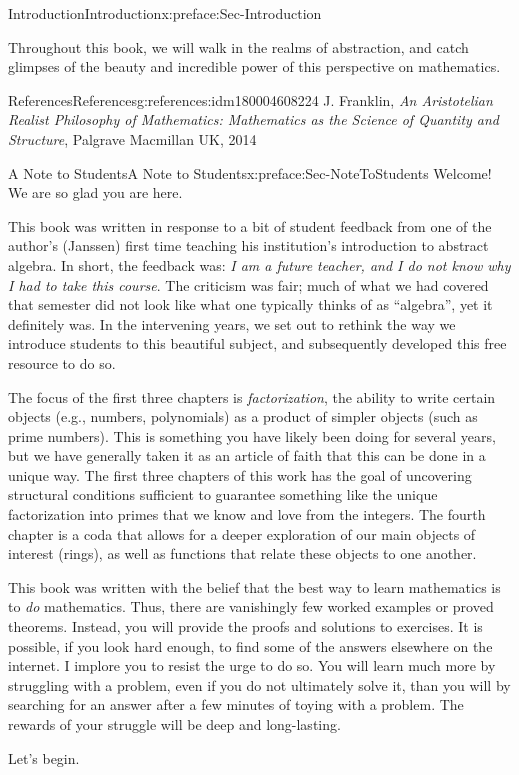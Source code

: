 \documentclass[oneside,10pt,]{book}
\numberwithin{equation}{section}
\begin{document}
\begin{preface}{Introduction}{}{Introduction}{}{}{x:preface:Sec-Introduction}
\par
Throughout this book, we will walk in the realms of abstraction, and catch glimpses of the beauty and incredible power of this perspective on mathematics.%
%
%
\typeout{************************************************}
\typeout{************************************************}
%
\begin{references--numberless}{References}{}{References}{}{}{g:references:idm180004608224}
J. Franklin, \emph{An Aristotelian Realist Philosophy of Mathematics: Mathematics as the Science of Quantity and Structure}, Palgrave Macmillan UK, 2014\end{references--numberless}
\end{preface}
%
%
\typeout{************************************************}
\typeout{************************************************}
%
\begin{preface}{A Note to Students}{}{A Note to Students}{}{}{x:preface:Sec-NoteToStudents}
Welcome! We are so glad you are here.%
\par
This book was written in response to a bit of student feedback from one of the author's (Janssen) first time teaching his institution's introduction to abstract algebra. In short, the feedback was: \emph{I am a future teacher, and I do not know why I had to take this course}. The criticism was fair; much of what we had covered that semester did not look like what one typically thinks of as ``algebra'', yet it definitely was. In the intervening years, we set out to rethink the way we introduce students to this beautiful subject, and subsequently developed this free resource to do so.%
\par
The focus of the first three chapters is \emph{factorization}, the ability to write certain objects (e.g., numbers, polynomials) as a product of simpler objects (such as prime numbers). This is something you have likely been doing for several years, but we have generally taken it as an article of faith that this can be done in a unique way. The first three chapters of this work has the goal of uncovering structural conditions sufficient to guarantee something like the unique factorization into primes that we know and love from the integers. The fourth chapter is a coda that allows for a deeper exploration of our main objects of interest (rings), as well as functions that relate these objects to one another.%
\par
This book was written with the belief that the best way to learn mathematics is to \emph{do} mathematics. Thus, there are vanishingly few worked examples or proved theorems. Instead, you will provide the proofs and solutions to exercises. It is possible, if you look hard enough, to find some of the answers elsewhere on the internet. I implore you to resist the urge to do so. You will learn much more by struggling with a problem, even if you do not ultimately solve it, than you will by searching for an answer after a few minutes of toying with a problem. The rewards of your struggle will be deep and long-lasting.%
\par
Let's begin.%
\end{preface}
\end{document}
